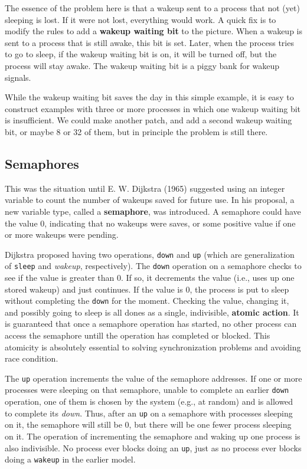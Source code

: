 \documentclass{book}
\newcommand {\kw}  [1] {\textbf{#1}}
\newcommand {\sys} [1] {\textsl{#1}}
\newcommand {\cmd} [1] {\texttt{#1}}
\begin{document}
The essence of the problem here is that a wakeup sent to a process that not (yet) sleeping is lost.
If it were not lost, everything would work.
A quick fix is to modify the rules to add a \kw{wakeup waiting bit} to the picture.
When a wakeup is sent to a process that is still awake, this bit is set.
Later, when the process tries to go to sleep, if the wakeup waiting bit is on, it will be turned off,
but the process will stay awake.
The wakeup waiting bit is a piggy bank for wakeup signals.


While the wakeup waiting bit saves the day in this simple example, 
it is easy to construct examples with three or more processes in which one wakeup waiting bit is insufficient.
We could make another patch, and add a second wakeup waiting bit, or maybe 8 or 32 of them, but in principle the problem is still there.

\subsection{Semaphores}
This was the situation until E. W. Dijkstra (1965) suggested using an integer variable to count the number of wakeups saved for future use.
In his proposal, a new variable type, called a \kw{semaphore}, was introduced.
A semaphore could have the value 0, indicating that no wakeups were saves, 
or some positive value if one or more wakeups were pending.

Dijkstra proposed having two operations, \cmd{down} and \cmd{up} 
(which are generalization of \cmd{sleep} and \sys{wakeup}, respectively).
The \cmd{down} operation on a semaphore checks to see if the value is greater than 0.
If so, it decrements the value (i.e., uses up one stored wakeup) and just continues.
If the value is 0, the process is put to sleep without completing the \cmd{down} for the moment.
Checking the value, changing it, and possibly going  to sleep is all dones as a single, indivisible, \kw{atomic action}.
It is guaranteed that once a semaphore operation has started, 
no other process can access the semaphore untill the operation has completed or blocked.
This atomicity is absolutely essential to solving synchronization problems and avoiding race condition.

The \cmd{up} operation increments the value of the semaphore addresses.
If one or more processes were sleeping on that semaphore, unable to complete an earlier \cmd{down} operation,
one of them is chosen by the system (e.g., at random) and is allowed to complete its \sys{down}.
Thus, after an \cmd{up} on a semaphore with processes sleeping on it, the semaphore will still be 0,
but there will be one fewer process sleeping on it.
The operation of incrementing the semaphore and waking up one process is also indivisible.
No process ever blocks doing an \cmd{up}, just as no process ever blocks doing a \cmd{wakeup} in the earlier model.
\end{document}
